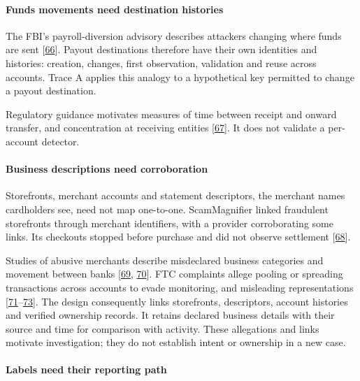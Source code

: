\documentclass[
  11pt,
]{article}
\begin{document}
\hypertarget{funds-movements-need-destination-histories}{%
\paragraph{Funds movements need destination
histories}\label{funds-movements-need-destination-histories}}

The FBI's payroll-diversion advisory describes attackers changing where
funds are sent {[}\protect\hyperlink{ref-FBI2018}{66}{]}. Payout
destinations therefore have their own identities and histories:
creation, changes, first observation, validation and reuse across
accounts. Trace A applies this analogy to a hypothetical key permitted
to change a payout destination.

Regulatory guidance motivates measures of time between receipt and
onward transfer, and concentration at receiving entities
{[}\protect\hyperlink{ref-FinCEN2014}{67}{]}. It does not validate a
per-account detector.

\hypertarget{business-descriptions-need-corroboration}{%
\paragraph{Business descriptions need
corroboration}\label{business-descriptions-need-corroboration}}

Storefronts, merchant accounts and statement descriptors, the merchant
names cardholders see, need not map one-to-one. ScamMagnifier linked
fraudulent storefronts through merchant identifiers, with a provider
corroborating some links. Its checkouts stopped before purchase and did
not observe settlement {[}\protect\hyperlink{ref-Bitaab2025}{68}{]}.

Studies of abusive merchants describe misdeclared business categories
and movement between banks {[}\protect\hyperlink{ref-McCoy2012}{69},
\protect\hyperlink{ref-Tian2018}{70}{]}. FTC complaints allege pooling
or spreading transactions across accounts to evade monitoring, and
misleading representations
{[}\protect\hyperlink{ref-FTC2020FirstData}{71}--\protect\hyperlink{ref-FTC2019Allied}{73}{]}.
The design consequently links storefronts, descriptors, account
histories and verified ownership records. It retains declared business
details with their source and time for comparison with activity. These
allegations and links motivate investigation; they do not establish
intent or ownership in a new case.

\hypertarget{labels-need-their-reporting-path}{%
\paragraph{Labels need their reporting
path}\label{labels-need-their-reporting-path}}
\end{document}
